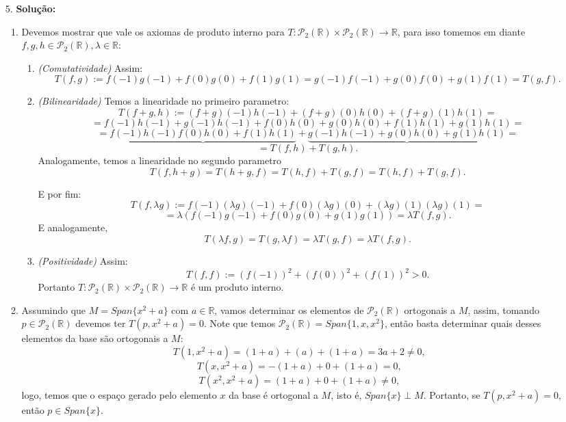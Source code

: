 \documentclass{article}
\begin{document}
\begin{enumerate}
		\item[5.] \textbf{Solução:}
			\begin{enumerate}
				\item Devemos mostrar que vale os axiomas de produto interno para $T: \mathcal{P}_{2}(\mathbb{R}) \times \mathcal{P}_{2}(\mathbb{R}) \to \mathbb{R}$, para isso tomemos em diante $f,g,h \in \mathcal{P}_{2}(\mathbb{R}), \lambda \in \mathbb{R}$:
					\begin{enumerate}
						\item \textit{(Comutatividade)} Assim: 
						$$
						T(f, g):= f(-1)g(-1) + f(0)g(0) + f(1)g(1) = g(-1)f(-1) + g(0)f(0) + g(1)f(1) = T(g, f).
						$$
						
						\item \textit{(Bilinearidade)} Temos a linearidade no primeiro parametro: 
						$$
						T(f+g, h) := (f+g)(-1)h(-1) +(f+g)(0)h(0)+(f+g)(1)h(1) =  
						$$
						$$
						= f(-1)h(-1)+g(-1)h(-1) +f(0)h(0)+g(0)h(0)+f(1)h(1)+g(1)h(1)=
						$$ 
						$$
						= \underbrace{f(-1)h(-1)f(0)h(0)+f(1)h(1)}+\underbrace{g(-1)h(-1) +g(0)h(0)+g(1)h(1)}=
						$$
						$$
						= T(f, h) + T(g,h).
						$$
						Analogamente, temos a linearidade no segundo parametro 
						$$
						T(f, h+g) = T(h+g, f) = T(h, f) + T(g, f) = T(h, f) + T(g, f).
						$$
						
						E por fim:
						$$
						T(f, \lambda g):= f(-1)(\lambda g)(-1) + f(0)(\lambda g)(0) + (\lambda g)(1)(\lambda g)(1) =
						$$
						$$
						=\lambda (f(-1)g(-1) + f(0)g(0) + g(1)g(1)) = \lambda T(f, g).
						$$
						E analogamente, 
						$$
						T(\lambda f, g) = T(g, \lambda f) = \lambda T(g,f) = \lambda T(f,g).
						$$
						
						\item \textit{(Positividade)} Assim:
						$$
						T(f,f) := (f(-1))^{2} + (f(0))^{2}+ (f(1))^{2}>0.
						$$
						Portanto $T: \mathcal{P}_{2}(\mathbb{R}) \times \mathcal{P}_{2}(\mathbb{R}) \to \mathbb{R}$ é um produto interno.
					\end{enumerate}
					
					\item Assumindo que $M = Span\{x^{2}+a\}$ com $a \in \mathbb{R}$, vamos determinar os elementos de $\mathcal{P}_{2}(\mathbb{R})$ ortogonais a $M$, assim, tomando $p \in \mathcal{P}_{2}(\mathbb{R})$ devemos ter $T(p, x^{2}+a)=0$. Note que temos $\mathcal{P}_{2}(\mathbb{R}) = Span\{1, x, x^{2}\}$, então basta determinar quais desses elementos da base são ortogonais a $M$:
					$$
					T(1, x^{2}+a) = (1+a)+(a)+(1+a)= 3a+2 \neq 0,
					$$
					$$
					T(x, x^{2}+a) = -(1+a)+0+(1+a)=0,
					$$
					$$
					T(x^{2}, x^{2}+a) = (1+a)+0+(1+a) \neq 0,
					$$
					logo, temos que o espaço gerado pelo elemento $x$ da base é ortogonal a $M$, isto é, $Span\{x\}\perp M$. Portanto, se $T(p, x^{2}+a) = 0$, então $p \in Span\{x\}$.
				
					
			\end{enumerate}
		
		
	\end{enumerate}
		
\end{document}
